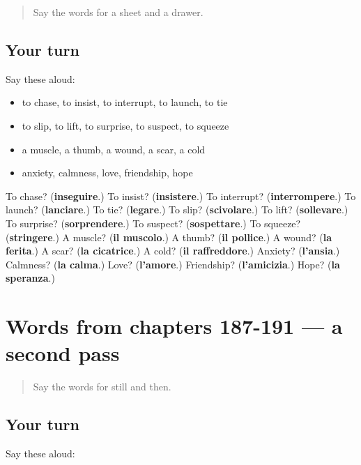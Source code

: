 \begin{quote}
Say the words for a sheet and a drawer.
\end{quote}

\subsection*{Your turn}
Say these aloud:

\begin{itemize}
\raggedright
  \item to chase, to insist, to interrupt, to launch, to tie
  \item to slip, to lift, to surprise, to suspect, to squeeze
  \item a muscle, a thumb, a wound, a scar, a cold
  \item anxiety, calmness, love, friendship, hope
\end{itemize}

\begin{tcolorbox}[breakable,colback=teal!4,colframe=teal!35!black,title={Before you move on}]
To chase? (\textbf{inseguire}.) To insist? (\textbf{insistere}.) To interrupt? (\textbf{interrompere}.) To launch? (\textbf{lanciare}.) To tie? (\textbf{legare}.) To slip? (\textbf{scivolare}.) To lift? (\textbf{sollevare}.) To surprise? (\textbf{sorprendere}.) To suspect? (\textbf{sospettare}.) To squeeze? (\textbf{stringere}.) A muscle? (\textbf{il muscolo}.) A thumb? (\textbf{il pollice}.) A wound? (\textbf{la ferita}.) A scar? (\textbf{la cicatrice}.) A cold? (\textbf{il raffreddore}.) Anxiety? (\textbf{l'ansia}.) Calmness? (\textbf{la calma}.) Love? (\textbf{l'amore}.) Friendship? (\textbf{l'amicizia}.) Hope? (\textbf{la speranza}.)
\end{tcolorbox}
\section[(dialogue)]{Words from chapters 187-191 — a second pass}

\label{lesson:IT-R191-second-pass-words-from-chapters-187-191}



\begin{quote}
Say the words for still and then.
\end{quote}

\subsection*{Your turn}
Say these aloud:

